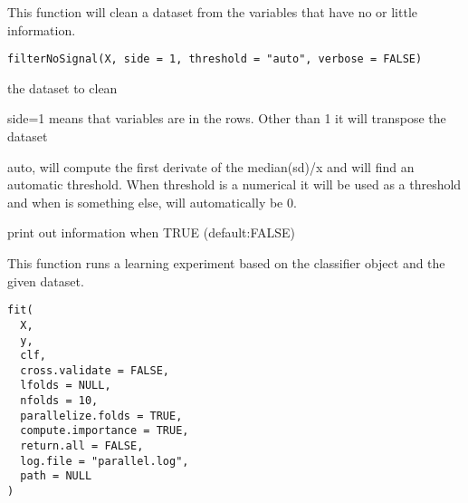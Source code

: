 \documentclass[a4paper]{book}
\begin{document}
%
\begin{Description}
This function will clean a dataset from the variables that have no or little information.
\end{Description}
%
\begin{Usage}
\begin{verbatim}
filterNoSignal(X, side = 1, threshold = "auto", verbose = FALSE)
\end{verbatim}
\end{Usage}
%
\begin{Arguments}
\begin{ldescription}
\item[\code{X:}] the dataset to clean

\item[\code{side:}] side=1 means that variables are in the rows. Other than 1 it will transpose the dataset

\item[\code{threshold:}] auto, will compute the first derivate of the median(sd)/x and will find an automatic threshold. When threshold is a numerical it will be used as a threshold and when is something else, will automatically be 0.

\item[\code{verbose:}] print out information when TRUE (default:FALSE)
\end{ldescription}
\end{Arguments}
%
\begin{Description}
This function runs a learning experiment based on the classifier
object and the given dataset.
\end{Description}
%
\begin{Usage}
\begin{verbatim}
fit(
  X,
  y,
  clf,
  cross.validate = FALSE,
  lfolds = NULL,
  nfolds = 10,
  parallelize.folds = TRUE,
  compute.importance = TRUE,
  return.all = FALSE,
  log.file = "parallel.log",
  path = NULL
)
\end{verbatim}
\end{Usage}
%
\end{document}
